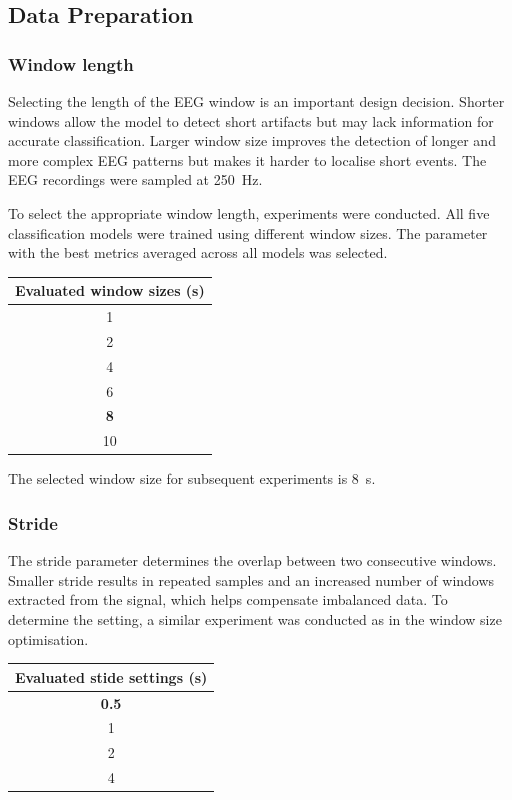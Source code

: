 \subsection{Data Preparation}

\subsubsection{Window length}

Selecting the length of the EEG window is an important design decision. Shorter windows allow the model to detect short artifacts but may lack information for accurate classification. Larger window size improves the detection of longer and more complex EEG patterns but makes it harder to localise short events. The EEG recordings were sampled at 250~Hz.

To select the appropriate window length, experiments were conducted. All five classification models were trained using different window sizes. The parameter with the best metrics averaged across all models was selected. 

\begin{table}[H]
\centering
\begin{tabular}{c}
\toprule
\textbf{Evaluated window sizes (s)} \\
\midrule
1 \\
2 \\
4 \\
6 \\
\textbf{8}\\
10 \\
\bottomrule
\end{tabular}
\end{table}

The selected window size for subsequent experiments is 8~s.

\subsubsection{Stride}

The stride parameter determines the overlap between two consecutive windows. Smaller stride results in repeated samples and an increased number of windows extracted from the signal, which helps compensate imbalanced data. To determine the setting, a similar experiment was conducted as in the window size optimisation. 

\begin{table}[H]
\centering
\begin{tabular}{c}
\toprule
\textbf{Evaluated stide settings (s)} \\
\midrule
\textbf{0.5} \\
1 \\
2 \\
4 \\
\bottomrule
\end{tabular}
\end{table}

